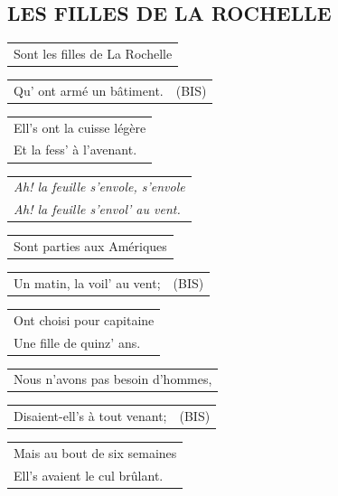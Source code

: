 \documentclass{article}
\begin{document}
\subsection*{LES FILLES DE LA ROCHELLE}
\begin{flushleft}
\begin{tabularx}{\textwidth} {
    >{\raggedright\arraybackslash}X}
Sont les filles de La Rochelle\\
\end{tabularx}
\begin{tabularx}{\textwidth} {
    >{\raggedright\arraybackslash}X|c}
Qu’ ont armé un bâtiment. & (BIS)\\
\end{tabularx}
\begin{tabularx}{\textwidth} {
    >{\raggedright\arraybackslash}X}
Ell’s ont la cuisse légère \\
Et la fess’ à l’avenant.\\
\end{tabularx}
\end{flushleft}
\begin{flushleft}
\begin{tabularx}{\textwidth} {
    >{\raggedright\arraybackslash}X}
\textit{Ah! la feuille s’envole, s’envole}\\
\textit{Ah! la feuille s’envol’ au vent.}\\
\end{tabularx}
\end{flushleft}
\begin{flushleft}
\begin{tabularx}{\textwidth} {
    >{\raggedright\arraybackslash}X}
Sont parties aux Amériques\\
\end{tabularx}
\begin{tabularx}{\textwidth} {
    >{\raggedright\arraybackslash}X|c}
Un matin, la voil’ au vent; & (BIS)\\
\end{tabularx}
\begin{tabularx}{\textwidth} {
    >{\raggedright\arraybackslash}X}
Ont choisi pour capitaine \\
Une fille de quinz’ ans.\\
\end{tabularx}
\end{flushleft}
\begin{flushleft}
\begin{tabularx}{\textwidth} {
    >{\raggedright\arraybackslash}X}
Nous n’avons pas besoin d’hommes,\\
\end{tabularx}
\begin{tabularx}{\textwidth} {
    >{\raggedright\arraybackslash}X|c}
Disaient-ell’s à tout venant; & (BIS)\\
\end{tabularx}
\begin{tabularx}{\textwidth} {
    >{\raggedright\arraybackslash}X}
Mais au bout de six semaines \\
Ell’s avaient le cul brûlant.\\
\end{tabularx}
\end{flushleft}
\end{document}
